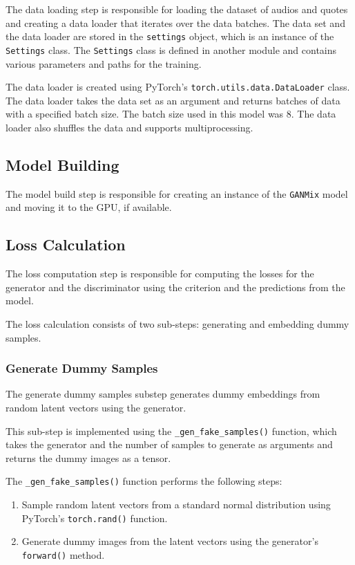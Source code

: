 The data loading step is responsible for loading the dataset of audios and quotes and creating a data loader that iterates over the data batches. The data set and the data loader are stored in the \texttt{settings} object, which is an instance of the \texttt{Settings} class. The \texttt{Settings} class is defined in another module and contains various parameters and paths for the training.

The data loader is created using PyTorch's \texttt{torch.utils.data.DataLoader} class. The data loader takes the data set as an argument and returns batches of data with a specified batch size. The batch size used in this model was 8. The data loader also shuffles the data and supports multiprocessing.

\subsection{Model Building}

The model build step is responsible for creating an instance of the \texttt{GANMix} model and moving it to the \ac{GPU}, if available.

\subsection{Loss Calculation}

The loss computation step is responsible for computing the losses for the generator and the discriminator using the criterion and the predictions from the model.

The loss calculation consists of two sub-steps: generating and embedding dummy samples.

\subsubsection{Generate Dummy Samples}

The generate dummy samples substep generates dummy embeddings from random latent vectors using the generator.

This sub-step is implemented using the \texttt{\_gen\_fake\_samples()} function, which takes the generator and the number of samples to generate as arguments and returns the dummy images as a tensor.

The \texttt{\_gen\_fake\_samples()} function performs the following steps:

\begin{enumerate}
    \item Sample random latent vectors from a standard normal distribution using PyTorch's \texttt{torch.rand()} function.
    \item Generate dummy images from the latent vectors using the generator's \texttt{forward()} method.
\end{enumerate}

